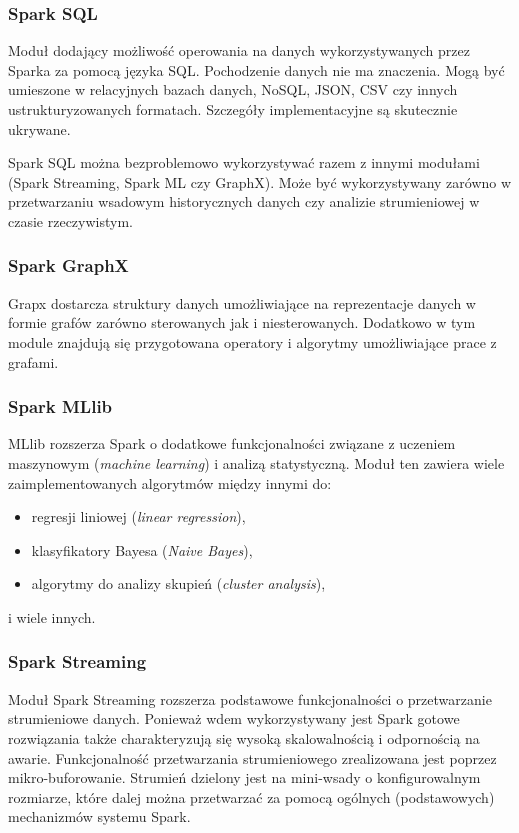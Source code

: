 \subsubsection*{Spark SQL}
Moduł dodający możliwość operowania na danych wykorzystywanych przez Sparka za pomocą języka SQL.
Pochodzenie danych nie ma znaczenia. Mogą być umieszone w
relacyjnych bazach danych, NoSQL, JSON, CSV czy innych ustrukturyzowanych formatach.
Szczegóły implementacyjne są skutecznie ukrywane.

Spark SQL można bezproblemowo wykorzystywać razem z innymi modułami (Spark Streaming, Spark ML czy GraphX).
Może być wykorzystywany zarówno w przetwarzaniu wsadowym historycznych danych
czy analizie strumieniowej w czasie rzeczywistym.
\subsubsection*{Spark GraphX}
Grapx dostarcza struktury danych umożliwiające na reprezentacje danych w formie grafów
zarówno sterowanych jak i niesterowanych.
Dodatkowo w tym module znajdują się przygotowana operatory i algorytmy umożliwiające prace z grafami.
\subsubsection*{Spark MLlib}
MLlib rozszerza Spark o dodatkowe funkcjonalności związane z uczeniem maszynowym (\textit{machine learning})
i analizą statystyczną.
Moduł ten zawiera wiele zaimplementowanych algorytmów między innymi do:
\begin{itemize}
  \item regresji liniowej (\textit{linear regression}),
  \item klasyfikatory Bayesa (\textit{Naive Bayes}),
  \item algorytmy do analizy skupień (\textit{cluster analysis}),
\end{itemize}
i wiele innych.
\subsubsection*{Spark Streaming}
Moduł Spark Streaming rozszerza podstawowe funkcjonalności o przetwarzanie strumieniowe danych.
Ponieważ wdem wykorzystywany jest Spark gotowe rozwiązania także charakteryzują się wysoką skalowalnością
i odpornością na awarie.
Funkcjonalność przetwarzania strumieniowego zrealizowana jest poprzez mikro-buforowanie.
Strumień dzielony jest na mini-wsady o konfigurowalnym rozmiarze,
które dalej można przetwarzać za pomocą ogólnych (podstawowych) mechanizmów systemu Spark.
